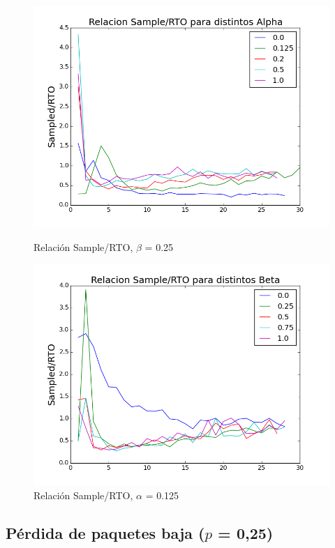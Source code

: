\begin{figure}[H]
\begin{minipage}{0.5\linewidth}
\includegraphics[width=\linewidth]{../graficos/alphad025var5drop0.png}
\caption{Relación Sample/RTO, $\beta$ = 0.25}\label{fig:alpha-var5-drop0-alto}
\end{minipage}
\hfill
\begin{minipage}{0.5\linewidth}
\includegraphics[width=\linewidth]{../graficos/betad025var5drop0.png}
\caption{Relación Sample/RTO, $\alpha$ = 0.125}\label{fig:beta-var5-drop0-alto}
\end{minipage}
\end{figure}

\subsection{Pérdida de paquetes baja ($p$ = 0,25)}

